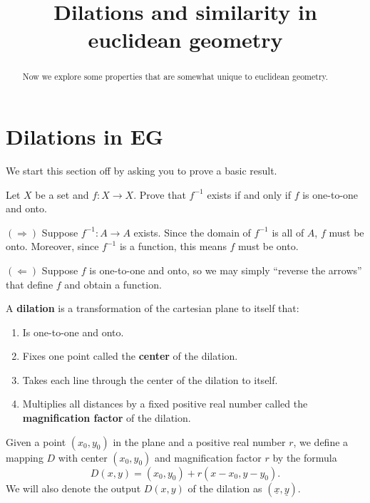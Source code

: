 \documentclass[newpage,hints,handout]{ximera}
\title{Dilations and similarity in euclidean geometry}
\begin{document}
\begin{abstract}
Now we explore some properties that are somewhat unique to euclidean
geometry.
\end{abstract}
\maketitle

\section{Dilations in \textbf{EG}}

We start this section off by asking you to prove a basic result.

\begin{problem}
  Let $X$ be a set and $f: X \to X$. Prove that $f^{-1}$ exists if and
  only if $f$ is one-to-one and onto.
  \begin{freeResponse}
    $(\Rightarrow)$ Suppose $f^{-1}:A\to A$ exists. Since the domain
    of $f^{-1}$ is all of $A$, $f$ must be onto. Moreover, since
    $f^{-1}$ is a function, this means $f$ must be onto. 
    
    $(\Leftarrow)$ Suppose $f$ is one-to-one and onto, so we may simply
    ``reverse the arrows'' that define $f$ and obtain a function.
  \end{freeResponse}
\end{problem}


\begin{definition}
A \textbf{dilation} is a transformation of the cartesian plane to
itself that:
\begin{enumerate}
\item Is one-to-one and onto.
\item Fixes one point called the \textbf{center} of the dilation.
\item Takes each line through the center of the dilation to itself.
\item Multiplies all distances by a fixed positive real number called
  the \textbf{magnification factor} of the dilation.
\end{enumerate}
\end{definition}

\begin{definition}
Given a point $\left(x_{0},y_{0}\right)$ in the plane and a positive
real number $r$, we define a mapping $D$ with center $\left(
x_{0},y_{0}\right)$ and magnification factor $r$ by the formula
\[
D\left(  x,y\right)  =\left(  x_{0},y_{0}\right)  +r\left(  x-x_{0}%
,y-y_{0}\right).
\]
We will also denote the output $D\left(x,y\right)$ of the dilation
as $\left(\underline{x},\underline{y}\right)$.
\end{definition}
\end{document}

